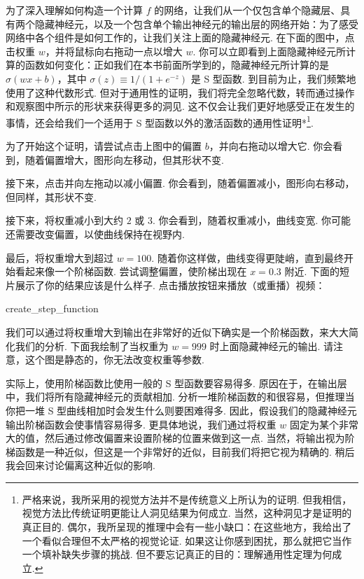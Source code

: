 为了深入理解如何构造一个计算 $f$ 的网络，让我们从一个仅包含单个隐藏层、具有两个隐藏神经元，以及一个包含单个输出神经元的输出层的网络开始：为了感受网络中各个组件是如何工作的，让我们关注上面的隐藏神经元. 在下面的图中，点击权重 $w$，并将鼠标向右拖动一点以增大 $w$. 你可以立即看到上面隐藏神经元所计算的函数如何变化：正如我们在本书前面所学到的，隐藏神经元所计算的是 $\sigma(wx + b)$，其中 $\sigma(z) \equiv 1/(1+e^{-z})$ 是 S 型函数. 到目前为止，我们频繁地使用了这种代数形式. 但对于通用性的证明，我们将完全忽略代数，转而通过操作和观察图中所示的形状来获得更多的洞见. 这不仅会让我们更好地感受正在发生的事情，还会给我们一个适用于 S 型函数以外的激活函数的通用性证明*\footnote{严格来说，我所采用的视觉方法并不是传统意义上所认为的证明. 但我相信，视觉方法比传统证明更能让人洞见结果为何成立. 当然，这种洞见才是证明的真正目的. 偶尔，我所呈现的推理中会有一些小缺口：在这些地方，我给出了一个看似合理但不太严格的视觉论证. 如果这让你感到困扰，那么就把它当作一个填补缺失步骤的挑战. 但不要忘记真正的目的：理解通用性定理为何成立.}.

为了开始这个证明，请尝试点击上图中的偏置 $b$，并向右拖动以增大它. 你会看到，随着偏置增大，图形向左移动，但其形状不变.

接下来，点击并向左拖动以减小偏置. 你会看到，随着偏置减小，图形向右移动，但同样，其形状不变.

接下来，将权重减小到大约 $2$ 或 $3$. 你会看到，随着权重减小，曲线变宽. 你可能还需要改变偏置，以使曲线保持在视野内.

最后，将权重增大到超过 $w = 100$. 随着你这样做，曲线变得更陡峭，直到最终开始看起来像一个阶梯函数. 尝试调整偏置，使阶梯出现在 $x = 0.3$ 附近. 下面的短片展示了你的结果应该是什么样子. 点击播放按钮来播放（或重播）视频：

\begin{movieNote}{create\_\allowbreak{}step\_\allowbreak{}function}
\end{movieNote}

\noindent 我们可以通过将权重增大到输出在非常好的近似下确实是一个阶梯函数，来大大简化我们的分析. 下面我绘制了当权重为 $w = 999$ 时上面隐藏神经元的输出. 请注意，这个图是静态的，你无法改变权重等参数.

实际上，使用阶梯函数比使用一般的 S 型函数要容易得多. 原因在于，在输出层中，我们将所有隐藏神经元的贡献相加. 分析一堆阶梯函数的和很容易，但推理当你把一堆 S 型曲线相加时会发生什么则要困难得多. 因此，假设我们的隐藏神经元输出阶梯函数会使事情容易得多. 更具体地说，我们通过将权重 $w$ 固定为某个非常大的值，然后通过修改偏置来设置阶梯的位置来做到这一点. 当然，将输出视为阶梯函数是一种近似，但这是一个非常好的近似，目前我们将把它视为精确的. 稍后我会回来讨论偏离这种近似的影响.

